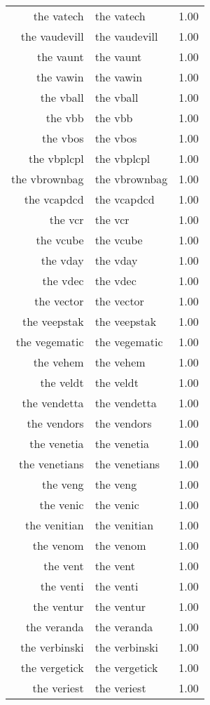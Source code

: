 \begin{table}[ht]
\begin{tabular}{rlr}
  the vatech & the vatech & 1.00 \\ 
  the vaudevill & the vaudevill & 1.00 \\ 
  the vaunt & the vaunt & 1.00 \\ 
  the vawin & the vawin & 1.00 \\ 
  the vball & the vball & 1.00 \\ 
  the vbb & the vbb & 1.00 \\ 
  the vbos & the vbos & 1.00 \\ 
  the vbplcpl & the vbplcpl & 1.00 \\ 
  the vbrownbag & the vbrownbag & 1.00 \\ 
  the vcapdcd & the vcapdcd & 1.00 \\ 
  the vcr & the vcr & 1.00 \\ 
  the vcube & the vcube & 1.00 \\ 
  the vday & the vday & 1.00 \\ 
  the vdec & the vdec & 1.00 \\ 
  the vector & the vector & 1.00 \\ 
  the veepstak & the veepstak & 1.00 \\ 
  the vegematic & the vegematic & 1.00 \\ 
  the vehem & the vehem & 1.00 \\ 
  the veldt & the veldt & 1.00 \\ 
  the vendetta & the vendetta & 1.00 \\ 
  the vendors & the vendors & 1.00 \\ 
  the venetia & the venetia & 1.00 \\ 
  the venetians & the venetians & 1.00 \\ 
  the veng & the veng & 1.00 \\ 
  the venic & the venic & 1.00 \\ 
  the venitian & the venitian & 1.00 \\ 
  the venom & the venom & 1.00 \\ 
  the vent & the vent & 1.00 \\ 
  the venti & the venti & 1.00 \\ 
  the ventur & the ventur & 1.00 \\ 
  the veranda & the veranda & 1.00 \\ 
  the verbinski & the verbinski & 1.00 \\ 
  the vergetick & the vergetick & 1.00 \\ 
  the veriest & the veriest & 1.00 \\ 

\end{tabular}
\end{table}

